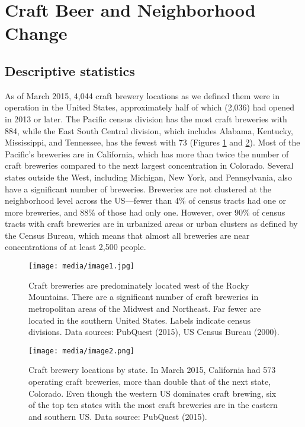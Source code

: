 \documentclass[]{article}
\begin{document}
\section{Craft Beer and Neighborhood
Change}\label{craft-beer-and-neighborhood-change}

\subsection{Descriptive statistics}\label{descriptive-statistics}

As of March 2015, 4,044 craft brewery locations as we defined them were
in operation in the United States, approximately half of which (2,036)
had opened in 2013 or later. The Pacific census division has the most
craft breweries with 884, while the East South Central division, which
includes Alabama, Kentucky, Mississippi, and Tennessee, has the fewest
with 73 (Figures \ref{fig:usa} and \ref{fig:breweries}). Most of the Pacific's breweries are in
California, which has more than twice the number of craft breweries
compared to the next largest concentration in Colorado. Several states
outside the West, including Michigan, New York, and Pennsylvania, also
have a significant number of breweries. Breweries are not clustered at
the neighborhood level across the US---fewer than 4\% of census tracts
had one or more breweries, and 88\% of those had only one. However, over
90\% of census tracts with craft breweries are in urbanized areas or
urban clusters as defined by the Census Bureau, which means that almost
all breweries are near concentrations of at least 2,500 people.

\begin{figure}
	\centering
		\texttt{[image: media/image1.jpg]}
	\caption{Craft breweries are predominately located west of the Rocky
Mountains. There are a significant number of craft breweries in
metropolitan areas of the Midwest and Northeast. Far fewer are located
in the southern United States. Labels indicate census divisions. Data
sources: PubQuest (2015), US Census Bureau (2000).}
	\label{fig:usa}
\end{figure} 

\begin{figure}
	\centering
		\texttt{[image: media/image2.png]}
	\caption{Craft brewery locations by state. In March 2015, California had 573
operating craft breweries, more than double that of the next state,
Colorado. Even though the western US dominates craft brewing, six of the
top ten states with the most craft breweries are in the eastern and
southern US. Data source: PubQuest (2015).}
	\label{fig:breweries}
\end{figure}
\end{document}
